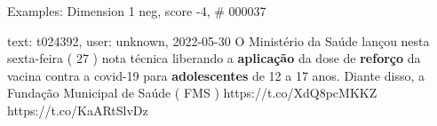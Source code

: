 \begin{frame}{Examples: Dimension 1 neg, score -4, \# 000037}
\footnotesize
\begin{alertblock}{text: t024392, user: unknown, 2022-05-30}
O Ministério da Saúde lançou nesta sexta-feira ( 27 ) nota técnica liberando a 
\textbf{aplicação} da dose de \textbf{reforço} da vacina contra a covid-19 para 
\textbf{adolescentes} de 12 a 17 anos. Diante disso, a Fundação Municipal de 
Saúde ( FMS ) https://t.co/XdQ8pcMKKZ https://t.co/KaARtSlvDz 
\end{alertblock}
\end{frame}
